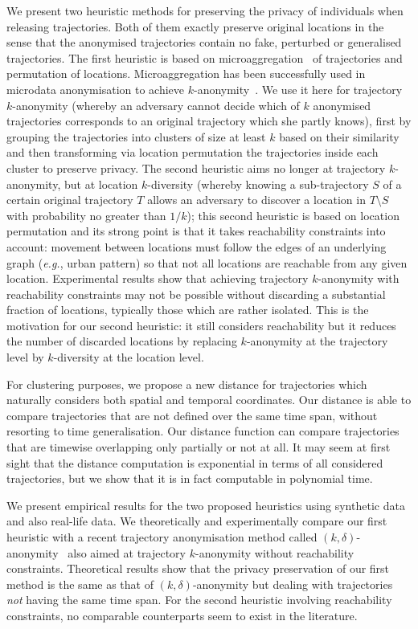 We present two heuristic methods for preserving the
privacy of individuals when releasing
trajectories. Both of them exactly preserve original locations
in the sense that the anonymised trajectories contain no fake, perturbed
or generalised trajectories.
The first heuristic is based on microaggregation~\cite{domingo02} of
trajectories and permutation of locations.
Microaggregation has been successfully used in microdata
anonymisation to achieve $k$-anonymity~\cite{samarati98,sweeney02a,domingo05}.
We use it here for trajectory $k$-anonymity (whereby an adversary
cannot decide which of $k$ anonymised trajectories corresponds
to an original trajectory which she partly knows),
first by grouping the trajectories into clusters of size
at least $k$ based on their similarity and then transforming
via location permutation the
trajectories inside each cluster to preserve privacy.
The second heuristic aims no longer at trajectory $k$-anonymity,
but at location $k$-diversity (whereby knowing a sub-trajectory
$S$ of a certain original trajectory $T$ allows an adversary to discover
a location in $T \setminus S$ with probability no greater than $1/k$);
this second heuristic is based on location permutation
and its strong point is that
it takes reachability constraints into account:
movement between locations must follow the edges of an underlying graph
({\em e.g.}, urban pattern) so that not all locations are reachable
from any given location.
Experimental results show that
achieving trajectory $k$-anonymity with reachability constraints
may not be possible without discarding
a substantial fraction of locations, typically those which are rather
isolated. This is the motivation for our second heuristic: it still
considers reachability but it reduces the number of discarded
locations by replacing $k$-anonymity at the trajectory
level by $k$-diversity at the location level.

For clustering purposes, we propose a new distance for trajectories
which naturally considers both spatial and temporal coordinates.
Our distance is able to compare trajectories
that are not defined over the same time span, without resorting
to time generalisation.
Our distance function can compare trajectories
that are timewise overlapping only
partially or not at all. It may seem at first sight that the distance
computation is exponential in terms of all considered trajectories, but
we show that it is in fact computable in polynomial time.

We present empirical results for the two proposed heuristics
using synthetic data and also real-life data.
We theoretically and experimentally compare our first heuristic
with a recent trajectory anonymisation method
called $(k, \delta)$-anonymity~\cite{abul08} also aimed at
trajectory $k$-anonymity without reachability constraints.
Theoretical results show that the privacy
preservation of our first method is the same as that of $(k, \delta)$-anonymity
but dealing with trajectories \emph{not} having the same time span. For the second heuristic involving reachability constraints, no comparable counterparts
seem to exist in the literature.





